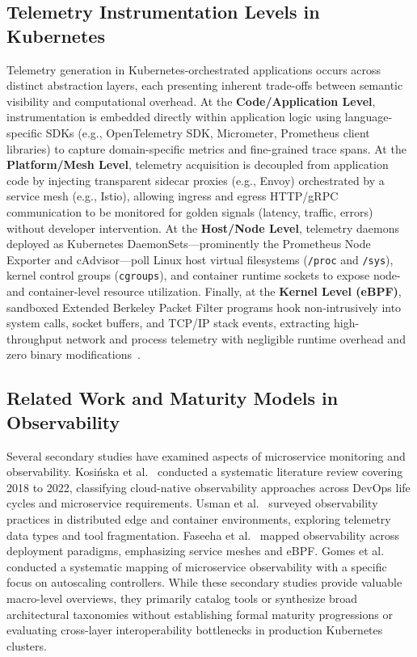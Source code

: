 \documentclass[sigconf, anonymous, balance=false]{acmart}
\begin{document}
\subsection{Telemetry Instrumentation Levels in Kubernetes}
Telemetry generation in Kubernetes-orchestrated applications occurs across distinct abstraction layers, each presenting inherent trade-offs between semantic visibility and computational overhead. At the \textbf{Code/Application Level}, instrumentation is embedded directly within application logic using language-specific SDKs (e.g., OpenTelemetry SDK, Micrometer, Prometheus client libraries) to capture domain-specific metrics and fine-grained trace spans. At the \textbf{Platform/Mesh Level}, telemetry acquisition is decoupled from application code by injecting transparent sidecar proxies (e.g., Envoy) orchestrated by a service mesh (e.g., Istio), allowing ingress and egress HTTP/gRPC communication to be monitored for golden signals (latency, traffic, errors) without developer intervention. At the \textbf{Host/Node Level}, telemetry daemons deployed as Kubernetes DaemonSets—prominently the Prometheus Node Exporter and cAdvisor—poll Linux host virtual filesystems (\texttt{/proc} and \texttt{/sys}), kernel control groups (\texttt{cgroups}), and container runtime sockets to expose node- and container-level resource utilization. Finally, at the \textbf{Kernel Level (eBPF)}, sandboxed Extended Berkeley Packet Filter programs hook non-intrusively into system calls, socket buffers, and TCP/IP stack events, extracting high-throughput network and process telemetry with negligible runtime overhead and zero binary modifications~\cite{rise_2023, faseeha_2025}.

\subsection{Related Work and Maturity Models in Observability}
Several secondary studies have examined aspects of microservice monitoring and observability. Kosińska et al.~\cite{kosinska_2023} conducted a systematic literature review covering 2018 to 2022, classifying cloud-native observability approaches across DevOps life cycles and microservice requirements. Usman et al.~\cite{usman_2022} surveyed observability practices in distributed edge and container environments, exploring telemetry data types and tool fragmentation. Faseeha et al.~\cite{faseeha_2025} mapped observability across deployment paradigms, emphasizing service meshes and eBPF. Gomes et al.~\cite{gomes_2025} conducted a systematic mapping of microservice observability with a specific focus on autoscaling controllers. While these secondary studies provide valuable macro-level overviews, they primarily catalog tools or synthesize broad architectural taxonomies without establishing formal maturity progressions or evaluating cross-layer interoperability bottlenecks in production Kubernetes clusters.
\end{document}
